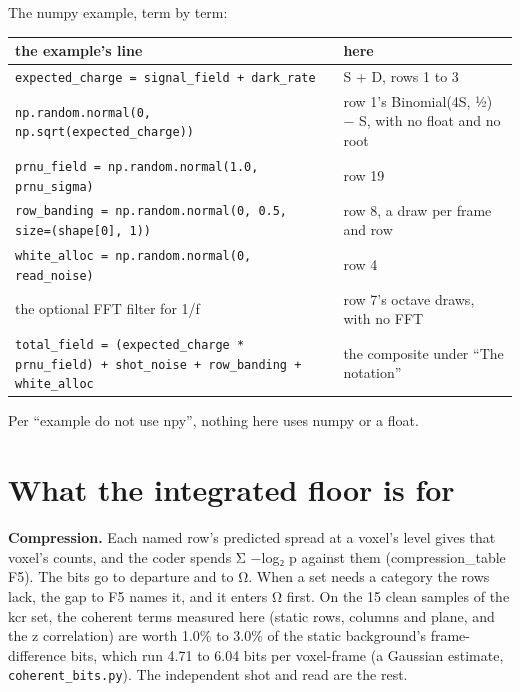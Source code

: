 The numpy example, term by term:

{\small
\setlength{\tabcolsep}{6pt}
\begin{longtable}{>{\RaggedRight\arraybackslash}p{}>{\RaggedRight\arraybackslash}p{}}
\toprule
the example's line & here \\
\midrule
\endhead
\texttt{expected\_\allowbreak{}charge = signal\_\allowbreak{}field + dark\_\allowbreak{}rate} & S + D, rows 1 to 3 \\
\texttt{np.\allowbreak{}random.\allowbreak{}normal(0, np.\allowbreak{}sqrt(expected\_\allowbreak{}charge))} & row 1's Binomial(4S, ½) − S, with no float and no root \\
\texttt{prnu\_\allowbreak{}field = np.\allowbreak{}random.\allowbreak{}normal(1.\allowbreak{}0, prnu\_\allowbreak{}sigma)} & row 19 \\
\texttt{row\_\allowbreak{}banding = np.\allowbreak{}random.\allowbreak{}normal(0, 0.\allowbreak{}5, size=(shape[0], 1))} & row 8, a draw per frame and row \\
\texttt{white\_\allowbreak{}alloc = np.\allowbreak{}random.\allowbreak{}normal(0, read\_\allowbreak{}noise)} & row 4 \\
the optional FFT filter for 1/f & row 7's octave draws, with no FFT \\
\texttt{total\_\allowbreak{}field = (expected\_\allowbreak{}charge * prnu\_\allowbreak{}field) + shot\_\allowbreak{}noise + row\_\allowbreak{}banding + white\_\allowbreak{}alloc} & the composite under “The notation” \\
\bottomrule
\end{longtable}
}

Per “example do not use npy”, nothing here uses numpy or a float.

\section{\texorpdfstring{What the integrated floor is for}{What the integrated floor is for}}

\textbf{Compression.} Each named row's predicted spread at a voxel's level gives that voxel's counts, and the coder spends Σ −log₂ p against them (compression\_\allowbreak{}table F5). The bits go to departure and to Ω. When a set needs a category the rows lack, the gap to F5 names it, and it enters Ω first. On the 15 clean samples of the kcr set, the coherent terms measured here (static rows, columns and plane, and the z correlation) are worth 1.0\% to 3.0\% of the static background's frame-difference bits, which run 4.71 to 6.04 bits per voxel-frame (a Gaussian estimate, \texttt{coherent\_\allowbreak{}bits.\allowbreak{}py}). The independent shot and read are the rest.

